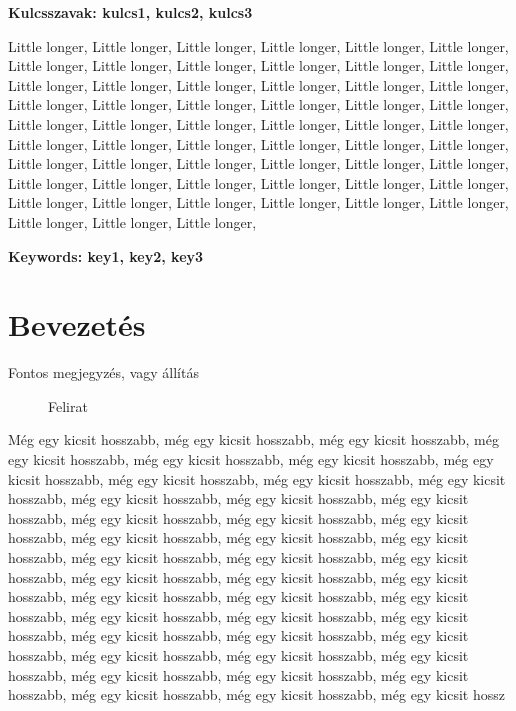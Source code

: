 \documentclass[a4paper,oneside,onecolumn,12pt]{LegrandOrangeBook}
\newcommand{\comment}[1]{{\textcolor{red}{#1}}}
\newcommand{\commentaron}[1]{{\textcolor{blue}{#1}}}
\begin{document}
\textbf{Kulcsszavak: kulcs1, kulcs2, kulcs3}

\pagebreak

Little longer, Little longer, Little longer, Little longer, Little longer, Little longer, Little longer, Little longer, Little longer, Little longer, Little longer, Little longer, Little longer, Little longer, Little longer, Little longer, Little longer, Little longer, Little longer, Little longer, Little longer, Little longer, Little longer, Little longer, Little longer, Little longer, Little longer, Little longer, Little longer, Little longer, Little longer, Little longer, Little longer, Little longer, Little longer, Little longer, Little longer, Little longer, Little longer, Little longer, Little longer, Little longer, Little longer, Little longer, Little longer, Little longer, Little longer, Little longer, Little longer, Little longer, Little longer, Little longer, Little longer, Little longer, Little longer, Little longer, Little longer, 

\textbf{Keywords: key1, key2, key3}

\pagebreak

\chapter*{Bevezetés}
\begin{eBox}
    Fontos megjegyzés, vagy állítás
\end{eBox}

\begin{figure}
  \begin{tBox}
  \end{tBox}
  \caption{Felirat}\label{fig:link}
\end{figure}  

Még egy kicsit hosszabb, még egy kicsit hosszabb, még egy kicsit hosszabb, még egy kicsit hosszabb, még egy kicsit hosszabb, még egy kicsit hosszabb, még egy kicsit hosszabb, még egy kicsit hosszabb, még egy kicsit hosszabb, még egy kicsit hosszabb, még egy kicsit hosszabb, még egy kicsit hosszabb, még egy kicsit hosszabb, még egy kicsit hosszabb, még egy kicsit hosszabb, még egy kicsit hosszabb, még egy kicsit hosszabb, még egy kicsit hosszabb, még egy kicsit hosszabb, még egy kicsit hosszabb, még egy kicsit hosszabb, még egy kicsit hosszabb, még egy kicsit hosszabb, még egy kicsit hosszabb, még egy kicsit hosszabb, még egy kicsit hosszabb, még egy kicsit hosszabb, még egy kicsit hosszabb, még egy kicsit hosszabb, még egy kicsit hosszabb, még egy kicsit hosszabb, még egy kicsit hosszabb, még egy kicsit hosszabb, még egy kicsit hosszabb, még egy kicsit hosszabb, még egy kicsit hosszabb, még egy kicsit hosszabb, még egy kicsit hosszabb, még egy kicsit hosszabb, még egy kicsit hosszabb, még egy kicsit hosszabb, még egy kicsit hosszabb, még egy kicsit hossz
\end{document}
